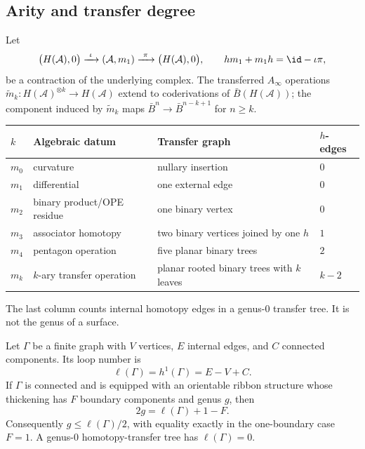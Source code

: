 \subsection{\texorpdfstring{Arity and transfer degree}{Arity and transfer degree}}

\begin{definition}
\label{def:mk-family-feynman}
Let
\[
\bigl(H(\mathcal A),0\bigr)
\xrightarrow{\ \iota\ }
(\mathcal A,m_1)
\xrightarrow{\ \pi\ }
\bigl(H(\mathcal A),0\bigr),
\qquad
h m_1+m_1h=\id-\iota\pi,
\]
be a contraction of the underlying complex.  The transferred
\(A_\infty\) operations
\(\widetilde m_k\colon H(\mathcal A)^{\otimes k}\to H(\mathcal A)\)
extend to coderivations of \(\bar B(H(\mathcal A))\); the component
induced by \(\widetilde m_k\) maps
\(\bar B^n\to \bar B^{n-k+1}\) for \(n\geq k\).

\begin{center}
\begin{tabular}{|>{\raggedright\arraybackslash}p{1.2cm}|>{\raggedright\arraybackslash}p{4.2cm}|>{\raggedright\arraybackslash}p{5.6cm}|>{\raggedright\arraybackslash}p{1.8cm}|}
\hline
\textbf{$k$} & \textbf{Algebraic datum} & \textbf{Transfer graph} & \textbf{$h$-edges} \\
\hline
\(m_0\) & curvature & nullary insertion & \(0\) \\
\hline
\(m_1\) & differential & one external edge & \(0\) \\
\hline
\(m_2\) & binary product/OPE residue & one binary vertex & \(0\) \\
\hline
\(m_3\) & associator homotopy & two binary vertices joined by one \(h\) & \(1\) \\
\hline
\(m_4\) & pentagon operation & five planar binary trees & \(2\) \\
\hline
\(m_k\) & \(k\)-ary transfer operation & planar rooted binary trees with \(k\) leaves & \(k-2\) \\
\hline
\end{tabular}
\end{center}
The last column counts internal homotopy edges in a genus-\(0\)
transfer tree.  It is not the genus of a surface.
\end{definition}

\begin{theorem}
\label{thm:loop-genus-formula}
Let \(\Gamma\) be a finite graph with \(V\) vertices, \(E\) internal
edges, and \(C\) connected components.  Its loop number is
\[
\ell(\Gamma)=h^1(\Gamma)=E-V+C.
\]
If \(\Gamma\) is connected and is equipped with an orientable ribbon
structure whose thickening has \(F\) boundary components and genus
\(g\), then
\[
2g=\ell(\Gamma)+1-F.
\]
Consequently \(g\leq \ell(\Gamma)/2\), with equality exactly in the
one-boundary case \(F=1\).  A genus-\(0\) homotopy-transfer tree has
\(\ell(\Gamma)=0\).
\end{theorem}

